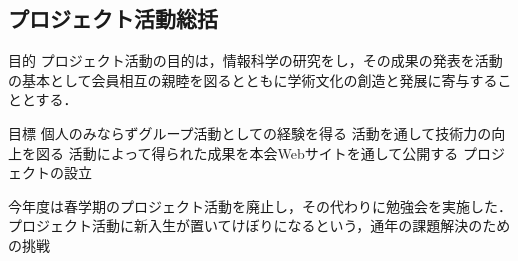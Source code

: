 \subsection*{プロジェクト活動総括}


目的
    プロジェクト活動の目的は，情報科学の研究をし，その成果の発表を活動の基本として会員相互の親睦を図るとともに学術文化の創造と発展に寄与することとする．

目標
    個人のみならずグループ活動としての経験を得る
    活動を通して技術力の向上を図る
    活動によって得られた成果を本会Webサイトを通して公開する
    プロジェクトの設立

今年度は春学期のプロジェクト活動を廃止し，その代わりに勉強会を実施した．
    プロジェクト活動に新入生が置いてけぼりになるという，通年の課題解決のための挑戦